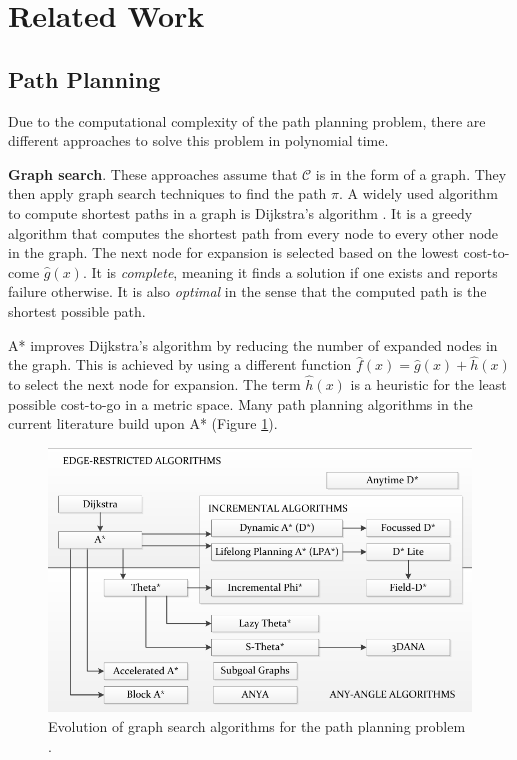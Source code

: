 \message{ !name(proposal.tex)}\documentclass[11pt,twocolumn]{article}
\begin{document}
\section*{Related Work}
\subsection*{Path Planning} Due to the computational complexity of the
path planning problem, there are different approaches to solve this
problem in polynomial time.

\textbf{Graph search}. These approaches assume that \(\mathcal{C}\) is
in the form of a graph. They then apply graph search techniques to
find the path \(\pi\). A widely used algorithm to compute shortest
paths in a graph is Dijkstra's algorithm
\cite{dijkstraNoteTwoProblems1959}. It is a greedy algorithm that
computes the shortest path from every node to every other node in the
graph. The next node for expansion is selected based on the lowest
cost-to-come \(\hat g(x)\). It is \textit{complete}, meaning it finds
a solution if one exists and reports failure otherwise. It is also
\textit{optimal} in the sense that the computed path is the shortest
possible path.

A* \cite{hartFormalBasisHeuristic1968} improves Dijkstra's algorithm
by reducing the number of expanded nodes in the graph. This is
achieved by using a different function \(\hat f(x) = \hat g(x) + \hat
h(x)\) to select the next node for expansion. The term \(\hat h(x)\)
is a heuristic for the least possible cost-to-go in a metric
space. Many path planning algorithms in the current literature build
upon A* (Figure \ref{fig:graph-search}).

\begin{figure}[h] \centering
\includegraphics[scale=.35]{graph_search_algorithms}
  \caption{Evolution of graph search algorithms for the path planning
problem \cite{sanchez-ibanezPathPlanningAutonomous2021}.}
  \label{fig:graph-search}
\end{figure}
\end{document}
